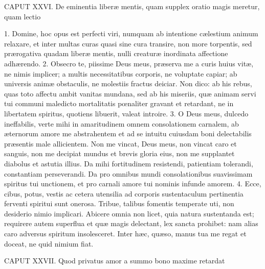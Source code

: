 CAPUT XXVI.
De eminentia liberæ mentis, quam supplex oratio magis meretur, quam lectio

1. Domine, hoc opus est perfecti viri, numquam ab intentione cælestium animum relaxare, et inter multas curas quasi sine cura transire, non more torpentis, sed prærogativa quadam liberæ mentis, nulli creaturæ inordinata affectione adhærendo.
2. Obsecro te, piissime Deus meus, præserva me a curis huius vitæ, ne nimis implicer; a multis necessitatibus corporis, ne voluptate capiar; ab universis animæ obstaculis, ne molestiis fractus deiciar. Non dico: ab his rebus, quas toto affectu ambit vanitas mundana, sed ab his miseriis, quæ animam servi tui communi maledicto mortalitatis pœnaliter gravant et retardant, ne in libertatem spiritus, quotiens libuerit, valeat introire.
3. O Deus meus, dulcedo ineffabilis, verte mihi in amaritudinem omnem consolationem carnalem, ab æternorum amore me abstrahentem et ad se intuitu cuiusdam boni delectabilis præsentis male allicientem. Non me vincat, Deus meus, non vincat caro et sanguis, non me decipiat mundus et brevis gloria eius, non me supplantet diabolus et astutia illius. Da mihi fortitudinem resistendi, patientiam tolerandi, constantiam perseverandi. Da pro omnibus mundi consolationibus suavissimam spiritus tui unctionem, et pro carnali amore tui nominis infunde amorem.
4. Ecce, cibus, potus, vestis ac cetera utensilia ad corporis sustentaculum pertinentia ferventi spiritui sunt onerosa. Tribue, talibus fomentis temperate uti, non desiderio nimio implicari. Abicere omnia non licet, quia natura sustentanda est; requirere autem superflua et quæ magis delectant, lex sancta prohibet: nam alias caro adversus spiritum insolesceret. Inter hæc, quæso, manus tua me regat et doceat, ne quid nimium fiat.


CAPUT XXVII.
Quod privatus amor a summo bono maxime retardat

